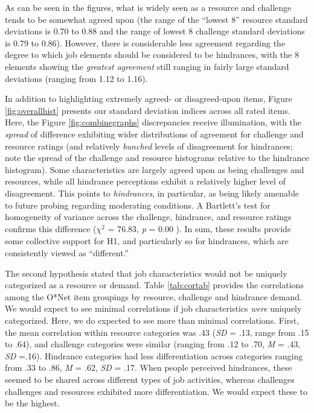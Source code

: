 \documentclass[
  english,
  man]{apa6}
\begin{document}
As can be seen in the figures, what is widely seen as a resource and challenge tends to be somewhat agreed upon (the range of the ``lowest 8'' resource standard deviations is 0.70 to 0.88 and the range of lowest 8 challenge standard deviations is 0.79 to 0.86). However, there is considerable less agreement regarding the degree to which job elements should be considered to be hindrances, with the 8 elements showing the \emph{greatest agreement} still ranging in fairly large standard deviations (ranging from 1.12 to 1.16).

In addition to highlighting extremely agreed- or disagreed-upon items, Figure \ref{fig:overallhist} presents our standard deviation indices across all rated items. Here, the Figure \ref{fig:combinegraphs} discrepancies receive illumination, with the \emph{spread} of difference exhibiting wider distributions of agreement for challenge and resource ratings (and relatively \emph{bunched} levels of disagreement for hindrances; note the spread of the challenge and resource histograms relative to the hindrance histogram). Some characteristics are largely agreed upon as being challenges and resources, while all hindrance perceptions exhibit a relatively higher level of disagreement. This points to \emph{hindrances}, in particular, as being likely amenable to future probing regarding moderating conditions. A Bartlett's test for homogeneity of variance across the challenge, hindrance, and resource ratings confirms this difference (\(\chi^2_{}\) = 76.83, \emph{p} = 0.00 ). In sum, these results provide some collective support for H1, and particularly so for hindrances, which are consistently viewed as ``different.''

The second hypothesis stated that job characteristics would not be uniquely categorized as a resource or demand. Table \ref{tab:cortab} provides the correlations among the O*Net item groupings by resource, challenge and hindrance demand. We would expect to see minimal correlations if job characteristics \emph{were} uniquely categorized. Here, we do expected to see more than minimal correlations. First, the mean correlation within resource categories was .43 (\emph{SD} = .13, range from .15 to .64), and challenge categories were similar (ranging from .12 to .70, \emph{M} = .43, \emph{SD} =.16). Hindrance categories had less differentiation across categories ranging from .33 to .86, \emph{M} = .62, \emph{SD} = .17. When people perceived hindrances, these seemed to be shared across different types of job activities, whereas challenges challenges and resources exhibited more differentiation. We would expect these to be the highest.
\end{document}
